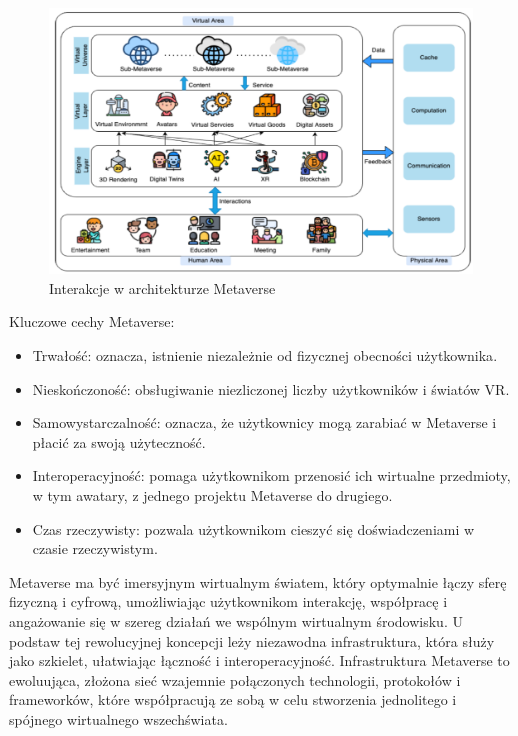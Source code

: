 \begin{figure}[htbp!]
    \centering
    \includegraphics[width=\textwidth]{images/metaverse/metaverseAbstractArchitecture.png}
    \caption{Interakcje w architekturze Metaverse\cite{aSurveyofMobileEdgeComputingForMetaverse}}
    \label{abstractMetaverseArchitectureHumanVirtualPhisical}
\end{figure}

Kluczowe cechy Metaverse:

\begin{itemize}
    \item Trwałość:  oznacza, istnienie niezależnie od fizycznej obecności użytkownika\cite{metaverseAFullDive}.
    \item Nieskończoność: obsługiwanie niezliczonej liczby użytkowników i światów VR\cite{metaverseAFullDive}.
    \item Samowystarczalność: oznacza, że użytkownicy mogą zarabiać w Metaverse i płacić za swoją użyteczność\cite{metaverseAFullDive}.
    \item Interoperacyjność: pomaga użytkownikom przenosić ich wirtualne przedmioty, w tym awatary, z jednego projektu Metaverse do drugiego\cite{metaverseAFullDive}.
    \item Czas rzeczywisty: pozwala użytkownikom cieszyć się doświadczeniami w czasie rzeczywistym\cite{metaverseAFullDive}.
\end{itemize}


Metaverse ma być imersyjnym wirtualnym światem, który optymalnie łączy sferę fizyczną i cyfrową, umożliwiając użytkownikom interakcję, współpracę i angażowanie się w szereg działań we wspólnym wirtualnym środowisku. U podstaw tej rewolucyjnej koncepcji leży niezawodna infrastruktura, która służy jako szkielet, ułatwiając łączność i interoperacyjność. Infrastruktura Metaverse to ewoluująca, złożona sieć wzajemnie połączonych technologii, protokołów i frameworków, które współpracują ze sobą w celu stworzenia jednolitego i spójnego wirtualnego wszechświata\cite{metaverseInfrastructureIEEE}.

